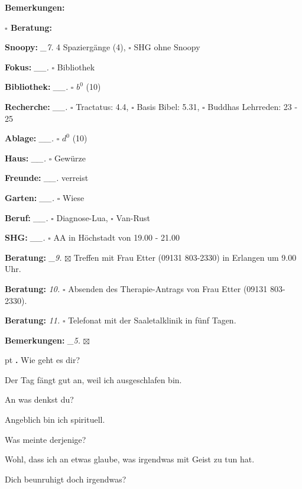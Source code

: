 \documentclass[10pt,a4paper]{article}
\newcounter{notec}
\newcommand\notep[1]{%
  \stepcounter{notec}
  \vskip #1pt
  {\bf\arabic{notec}.}
}
\newcommand\prop[1] {{\color {alizarin} {\bf #1}}}        %
\newcommand\opti[1] {{\color {amethyst} {\bf #1}}}        %
\newcommand\mand[1] {{\color {burntorange} {\bf #1}}}     %
\newcommand\bottomspace{\vskip 4pt}
\newcommand\n[1] { {\sl #1.} \hskip 5pt }
\begin{document}
\begin{mdframed}[style=daystyle]
\begin{labeling}{{\mand {Bemerkungen:}}}
\begin{minipage}{0.75\textwidth}
\begin{labeling}{\prop {$\square$ {Beratung:}}}
      \end{labeling}
    \end{minipage}
    \bottomspace
  \item[{\mand {Snoopy:}}]        \n{\_7} 4 Spaziergänge (4), $\square$ SHG ohne Snoopy
  \item[{\mand {Fokus:}}]        \n{\_\_} $\square$ Bibliothek
  \item[{\mand {Bibliothek:}}]   \n{\_\_} $\square$ $b^{0}$ (10)
  \item[{\mand {Recherche:}}]    \n{\_\_} $\square$ Tractatus: 4.4, $\square$ Basis Bibel: 5.31,
      $\square$ Buddhas Lehrreden: 23 - 25
  \item[{\mand {Ablage:}}]       \n{\_\_} $\square$ $d^{0}$ (10)
  \item[{\mand {Haus:}}]         \n{\_\_} $\square$ Gewürze
  \item[{\mand {Freunde:}}]      \n{\_\_} verreist
  \item[{\mand {Garten:}}]       \n{\_\_} $\square$ Wiese
  \item[{\mand {Beruf:}}]        \n{\_\_} $\square$ Diagnose-Lua, $\square$ Van-Rust
  \item[{\mand {SHG:}}]          \n{\_\_} $\square$ AA in Höchstadt von 19.00 - 21.00
  \item[{\opti {Beratung:}}]      \n{\_9} $\boxtimes$ Treffen mit Frau Etter (09131 803-2330) in Erlangen um 9.00 Uhr.
  \item[{\opti {Beratung:}}]       \n{10} $\square$ Absenden des Therapie-Antrags von Frau Etter (09131 803-2330).
  \item[{\opti {Beratung:}}]       \n{11} $\square$ Telefonat mit der Saaletalklinik in fünf Tagen.
  \item[{\mand {Bemerkungen:}}]   \n{\_5} $\boxtimes$
  \end{labeling}
    
  \setcounter{notec}{0}
  
  \notep 4 Wie geht es dir?

  \vskip 2pt
  Der Tag fängt gut an, weil ich ausgeschlafen bin.

  \vskip 2pt
  An was denkst du?

  \vskip 2pt
  Angeblich bin ich spirituell.

  \vskip 2pt
  Was meinte derjenige?

  \vskip 2pt
  Wohl, dass ich an etwas glaube, was irgendwas mit Geist zu tun hat.

  \vskip 2pt
  Dich beunruhigt doch irgendwas?


\end{mdframed}
\end{document}
